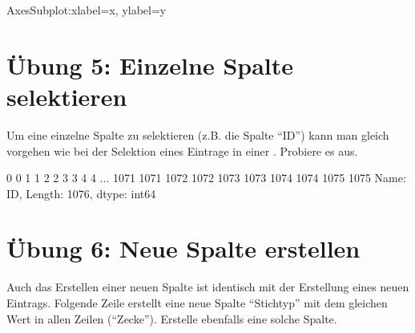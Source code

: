 \documentclass[letterpaper,10pt,english]{sphinxmanual}
\begin{document}
\begin{sphinxVerbatim}[commandchars=\\\{\}]
\PYGZlt{}AxesSubplot:xlabel=\PYGZsq{}x\PYGZsq{}, ylabel=\PYGZsq{}y\PYGZsq{}\PYGZgt{}
\end{sphinxVerbatim}


\section{Übung 5: Einzelne Spalte selektieren}
\label{\detokenize{01_04_Tabellarische_Daten:ubung-5-einzelne-spalte-selektieren}}
Um eine einzelne Spalte zu selektieren (z.B. die Spalte “ID”) kann man gleich vorgehen wie bei der Selektion eines Eintrage in einer . Probiere es aus.

\begin{sphinxVerbatim}[commandchars=\\\{\}]
\PYG{p}{[}\PYG{p}{]}
\end{sphinxVerbatim}

\begin{sphinxVerbatim}[commandchars=\\\{\}]
0          0
1          1
2          2
3          3
4          4
        ... 
1071    1071
1072    1072
1073    1073
1074    1074
1075    1075
Name: ID, Length: 1076, dtype: int64
\end{sphinxVerbatim}


\section{Übung 6: Neue Spalte erstellen}
\label{\detokenize{01_04_Tabellarische_Daten:ubung-6-neue-spalte-erstellen}}
Auch das Erstellen einer neuen Spalte ist identisch mit der Erstellung eines neuen  Eintrags. Folgende Zeile erstellt eine neue Spalte “Stichtyp” mit dem gleichen Wert in allen Zeilen (“Zecke”). Erstelle ebenfalls eine solche Spalte.

\begin{sphinxVerbatim}[commandchars=\\\{\}]
\PYG{p}{[}\PYG{p}{]}  

\end{sphinxVerbatim}
\end{document}
